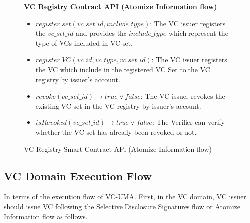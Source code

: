 \documentclass[conference, dvipdfmx]{IEEEtran} %
\begin{document}
\begin{sloppypar}
\begin{figure}[H]
  \centering
  \begin{center}
  \begin{varwidth}{8.5cm}
  \fbox
  {\parbox{\textwidth}
    {
      \begin{center}
        \textbf{VC Registry Contract API (Atomize Information flow)}
      \end{center}
      \begin{itemize}
        \item $register\_set(vc\_set\_id, include\_type)$: The VC issuer registers the $vc\_set\_id$ and provides the $include\_type$ which represent the type of VCs included in VC set.
        \item $register\_VC(vc\_id, vc\_type, vc\_set\_id)$: The VC issuer registers the VC which include in the registered VC Set to the VC registry by issuer’s account.
        
        \item $revoke(vc\_set\_id)  	\rightarrow true \lor false$: The VC issuer revokes the existing VC set in the VC registry by issuer’s account.
        
        \item $isRevoked(vc\_set\_id)  \rightarrow true \lor false$: The Verifier can verify whether the VC set has already been revoked or not.
      \end{itemize}
    }
  }
  \end{varwidth}
  \end{center}
  \caption{VC Registry Smart Contract API (Atomize Information flow)}
  \label{fig:VC_Registry_API_ai_flow}
\end{figure}

\subsection{VC Domain Execution Flow}
In terms of the execution flow of VC-UMA. First, in the VC domain, VC issuer should issue VC following the Selective Disclosure Signatures flow or Atomize Information flow as follows.



\end{sloppypar}
\end{document}

